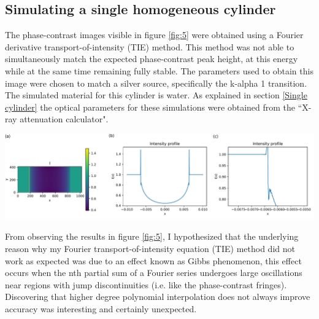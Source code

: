\documentclass[10pt, a4paper, singlespacing]{report}
\newenvironment{Figure}
    {\par\medskip\noindent\minipage{\linewidth}}
    {\endminipage\par\medskip}
\begin{document}

\subsection{Simulating a single homogeneous cylinder}\label{cylinder}
The phase-contrast images visible in figure \ref{fig:5} were obtained using a Fourier derivative transport-of-intensity (TIE) method. This method was not able to simultaneously match the expected phase-contrast peak height, at this energy while at the same time remaining fully stable. The parameters used to obtain this image were chosen to match a silver source, specifically the k-alpha 1 transition. The simulated material for this cylinder is water. As explained in section \ref{Single cylinder} the optical parameters for these simulations were obtained from the ``X-ray attenuation calculator".
\begin{Figure}
\centering
\includegraphics[width=\linewidth]{Fourier_intensity_profile.pdf}
\label{fig:5}
\end{Figure}
From observing the results in figure \ref{fig:5}, I hypothesized that the underlying reason why my Fourier transport-of-intensity equation (TIE) method did not work as expected was due to an effect known as Gibbs phenomenon, this effect occurs when the nth partial sum of a Fourier series undergoes large oscillations near regions with jump discontinuities\cite{Gibbs} (i.e. like the phase-contrast fringes). Discovering that higher degree polynomial interpolation does not always improve accuracy was interesting and certainly unexpected.
\end{document}
